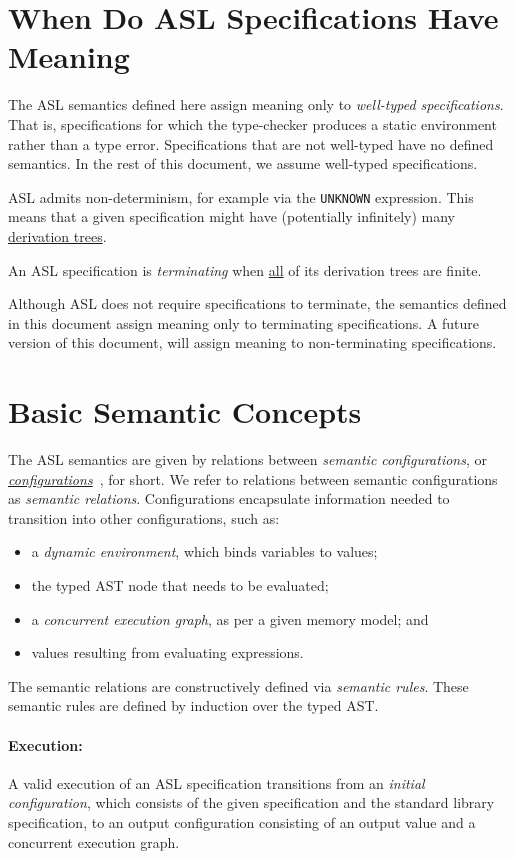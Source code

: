 \documentclass{book}
\begin{document}
\section{When Do ASL Specifications Have Meaning \label{sec:MeaningfulASLSpecifications}}
The ASL semantics defined here assign meaning only to \emph{well-typed specifications}.
That is, specifications for which the type-checker produces a static environment rather than
a type error.
Specifications that are not well-typed have no defined semantics.
In the rest of this document, we assume well-typed specifications.

ASL admits non-determinism, for example via the \texttt{UNKNOWN} expression.
This means that a given specification might have (potentially infinitely) many
\hyperlink{def-derivationtree}{derivation trees}.

An ASL specification is \emph{terminating} when \underline{all} of its derivation trees are finite.

Although ASL does not require specifications to terminate, the semantics defined in this
document assign meaning only to terminating specifications.
A future version of this document, will assign meaning to non-terminating specifications.

\section{Basic Semantic Concepts}
The ASL semantics are given by relations between \emph{semantic configurations},
or \hyperlink{def-configuration}{\emph{configurations}}~\cite{SemanticsWithApplicationsBook}, for short.
We refer to relations between semantic configurations as \emph{semantic relations}.
Configurations encapsulate information needed to transition into other configurations, such as:
\begin{itemize}
  \item a \emph{dynamic environment}, which binds variables to values;
  \item the typed AST node that needs to be evaluated;
  \item a \emph{concurrent execution graph}, as per a given memory model; and
  \item values resulting from evaluating expressions.
\end{itemize}
The semantic relations are constructively defined via \emph{semantic rules}.
These semantic rules are defined by induction over the typed AST.

\paragraph{Execution:}
A valid execution of an ASL specification transitions from an \emph{initial configuration},
which consists of the given specification and the standard library specification, to an output configuration
consisting of an output value and a concurrent execution graph.
\end{document}
